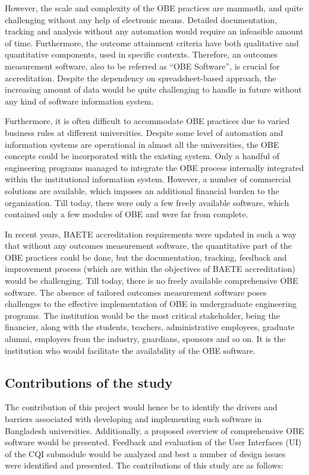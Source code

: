 \documentclass[journal,onecolumn]{IEEEtran}
\begin{document}
However, the scale and complexity of the OBE practices are mammoth, and quite challenging without any help of electronic means. Detailed documentation, tracking and analysis without any automation would require an infeasible amount of time. Furthermore, the outcome attainment criteria have both qualitative and quantitative components, used in specific contexts. Therefore, an outcomes measurement software, also to be referred as “OBE Software”, is crucial for accreditation. Despite the dependency on spreadsheet-based approach, the increasing amount of data would be quite challenging to handle in future without any kind of software information system.
\vspace{6pt}


Furthermore, it is often difficult to accommodate OBE practices due to varied business rules at different universities. Despite some level of automation and information systems are operational in almost all the universities, the OBE concepts could be incorporated with the existing system. Only a handful of engineering programs managed to integrate the OBE process internally integrated within the institutional information system. However, a number of commercial solutions are available, which imposes an additional financial burden to the organization. Till today, there were only a few freely available software, which contained only a few modules of OBE and were far from complete. 
\vspace{6pt}


In recent years, BAETE accreditation requirements were updated in such a way that without any outcomes measurement software, the quantitative part of the OBE practices could be done, but the documentation, tracking, feedback and improvement process (which are within the objectives of BAETE accreditation) would be challenging. Till today, there is no freely available comprehensive OBE software. The absence of tailored outcomes measurement software poses challenges to the effective implementation of OBE in undergraduate engineering programs. The institution would be the most critical stakeholder, being the financier, along with the students, teachers, administrative employees, graduate alumni, employers from the industry, guardians, sponsors and so on. It is the institution who would facilitate the availability of the OBE software. 


\subsection{\textbf{Contributions of the study}}
The contribution of this project would hence be to identify the drivers and barriers associated with developing and implementing such software in Bangladesh universities. Additionally, a proposed overview of comprehensive OBE software would be presented. Feedback and evaluation of the User Interfaces (UI) of the CQI submodule would be analyzed and best a number of design issues were identified and presented. The contributions of this study are as follows:
\end{document}

